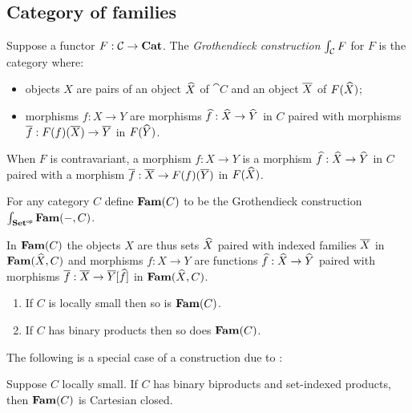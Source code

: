 \subsection{Category of families}
\label{sec:grothendieck}

\begin{definition}
Suppose a functor $F: \mathcal{C} \to \mathbf{Cat}$. The \emph{Grothendieck construction} $\int_{\mathcal{C}}F$ for
$F$ is the category where:
\begin{itemize}
\item objects $X$ are pairs of an object $\widehat{X}$ of $\cat{C}$ and an object $\overline{X}$ of $F(\widehat{X})$;
\item morphisms $f: X \to Y$ are morphisms $\widehat{f}: \widehat{X} \to \widehat{Y}$ in $C$ paired with morphisms
$\overline{f}: F(f)(\overline{X}) \to \overline{Y}$ in $F(\widehat{Y})$.
\end{itemize}
\end{definition}

\noindent When $F$ is contravariant, a morphism $f: X \to Y$ is a morphism $\widehat{f}: \widehat{X} \to \widehat{Y}$ in
$C$ paired with a morphism $\overline{f}: \overline{X} \to F(f)(\overline{Y})$ in $F(\widehat{X})$.

\begin{definition}
For any category $C$ define $\mathbf{Fam}(C)$ to be the Grothendieck construction
$\int_{\mathbf{Set}^{\mathsf{op}}}\mathbf{Fam}(-,C)$.
\end{definition}

\noindent In $\mathbf{Fam}(C)$ the objects $X$ are thus sets $\widehat{X}$ paired with indexed families $\overline{X}$ in
$\mathbf{Fam}(\widehat{X},C)$ and morphisms $f: X \to Y$ are functions $\widehat{f}: \widehat{X} \to \widehat{Y}$ paired with
morphisms $\overline{f}: \overline{X} \to \overline{Y}[\widehat{f}]$ in $\mathbf{Fam}(\widehat{X},C)$.

\begin{proposition}
\item
\begin{enumerate}
\item If $C$ is locally small then so is $\mathbf{Fam}(C)$.
\item If $C$ has binary products then so does $\mathbf{Fam}(C)$.
\end{enumerate}
\end{proposition}

The following is a special case of a construction due to \citet{nunes2023}:

\begin{proposition}
Suppose $C$ locally small. If $C$ has binary biproducts and set-indexed products, then $\mathbf{Fam}(C)$ is Cartesian
closed.
\end{proposition}

